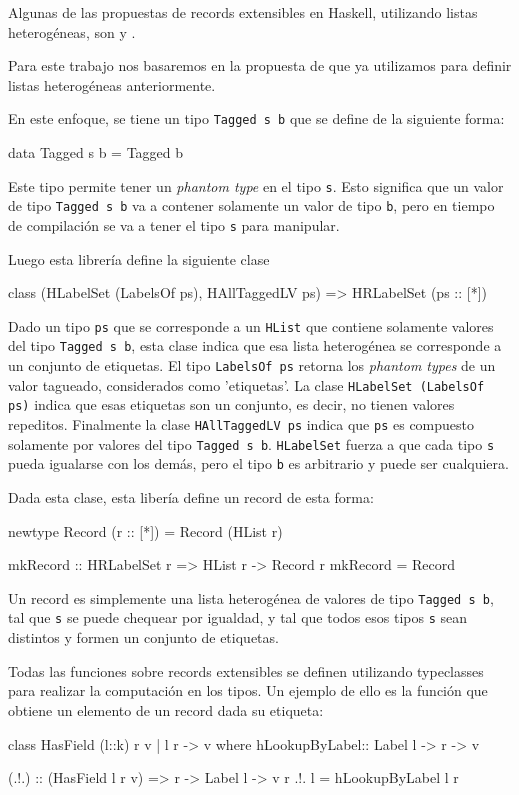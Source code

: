 Algunas de las propuestas de records extensibles en Haskell, utilizando listas heterogéneas, son \cite{Martinez:2013:JWC:2426890.2426908} y \cite{Kiselyov:2004:STH:1017472.1017488}.

Para este trabajo nos basaremos en la propuesta de \cite{Kiselyov:2004:STH:1017472.1017488} que ya utilizamos para definir listas heterogéneas anteriormente.

En este enfoque, se tiene un tipo \texttt{Tagged s b} que se define de la siguiente forma:

\begin{code}
data Tagged s b = Tagged b
\end{code}

Este tipo permite tener un \textit{phantom type} en el tipo \texttt{s}. Esto significa que un valor de tipo \texttt{Tagged s b} va a contener solamente un valor de tipo \texttt{b}, pero en tiempo de compilación se va a tener el tipo \texttt{s} para manipular.

Luego esta librería define la siguiente clase
\begin{code}
class (HLabelSet (LabelsOf ps), HAllTaggedLV ps) => 
  HRLabelSet (ps :: [*])
\end{code}

Dado un tipo \texttt{ps} que se corresponde a un \texttt{HList} que contiene solamente valores del tipo \texttt{Tagged s b}, esta clase indica que esa lista heterogénea se corresponde a un conjunto de etiquetas.
El tipo \texttt{LabelsOf ps} retorna los \textit{phantom types} de un valor tagueado, considerados como 'etiquetas'. La clase \texttt{HLabelSet (LabelsOf ps)} indica que esas etiquetas son un conjunto, es decir, no tienen valores repeditos. Finalmente la clase \texttt{HAllTaggedLV ps} indica que \texttt{ps} es compuesto solamente por valores del tipo \texttt{Tagged s b}.
\texttt{HLabelSet} fuerza a que cada tipo \texttt{s} pueda igualarse con los demás, pero el tipo \texttt{b} es arbitrario y puede ser cualquiera.

Dada esta clase, esta libería define un record de esta forma:

\begin{code}
newtype Record (r :: [*]) = Record (HList r)

mkRecord :: HRLabelSet r => HList r -> Record r
mkRecord = Record
\end{code}

Un record es simplemente una lista heterogénea de valores de tipo \texttt{Tagged s b}, tal que \texttt{s} se puede chequear por igualdad, y tal que todos esos tipos \texttt{s} sean distintos y formen un conjunto de etiquetas.

Todas las funciones sobre records extensibles se definen utilizando typeclasses para realizar la computación en los tipos.
Un ejemplo de ello es la función que obtiene un elemento de un record dada su etiqueta:

\begin{code}
class HasField (l::k) r v | l r -> v where
  hLookupByLabel:: Label l -> r -> v

(.!.) :: (HasField l r v) => r -> Label l -> v
r .!. l =  hLookupByLabel l r
\end{code}
